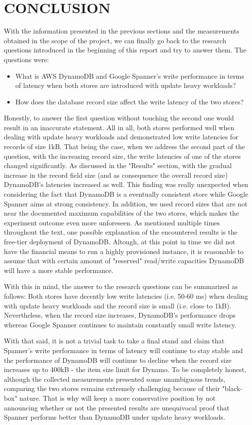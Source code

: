 \documentclass[letterpaper, 10 pt, conference]{ieeeconf}  %
\begin{document}
\section{CONCLUSION}
With the information presented in the previous sections and the measurements obtained in the scope of the project, we can finally go back to the research questions introduced in the beginning of this report and try to answer them. The questions were:
\begin{itemize}
    \item What is AWS DynamoDB and Google Spanner’s write performance in terms of latency when both stores are introduced with update heavy workloads? 
    \item How does the database record size affect the write latency of the two stores?  
\end{itemize}
Honestly, to answer the first question without touching the second one would result in an inaccurate statement. All in all, both stores performed well when dealing with update heavy workloads and demonstrated low write latencies for records of size 1kB. That being the case, when we address the second part of the question, with the increasing record size, the write latencies of one of the stores changed significantly. As discussed in the "Results" section, with the gradual increase in the record field size (and as consequence the overall record size) DynamoDB's latencies increased as well. This finding was really unexpected when considering the fact that DynamoDB is a eventually consistent store while Google Spanner aims at strong consistency. In addition, we used record sizes that are not near the documented maximum capabilities of the two stores, which makes the experiment outcome even more unforeseen.
As mentioned multiple times throughout the text, one possible explanation of the encountered results is the free-tier deployment of DynamoDB. Altough, at this point in time we did not have the financial means to run a highly provisioned instance, it is reasonable to assume that with certain amount of "reserved" read/write capacities DynamoDB will have a more stable performance. \par
With this in mind, the answer to the research questions can be summarized as follows:
Both stores have decently low write latencies (i.e. 50-60 ms) when dealing with update heavy workloads and the record size is small (i.e. close to 1kB). Nevertheless, when the record size increases, DynamoDB's performance drops whereas Google Spanner continues to maintain constantly small write latency. \par
With that said, it is not a trivial task to take a final stand and claim that Spanner's write performance in terms of latency will continue to stay stable and the performance of DynamoDB will continue to decline when the record size increases up to 400kB - the item size limit for Dynamo. To be completely honest, although the collected measurements presented some unambiguous trends,  comparing the two stores remains extremely challenging because of their "black-box" nature. That is why will keep a more conservative position by not announcing whether or not the presented results are unequivocal proof that Spanner performs better than DynamoDB under update heavy workloads. 
\end{document}
